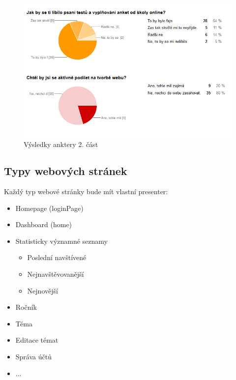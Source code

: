 \documentclass[thesis=B,czech]{FITthesis}[2012/06/26]
\begin{document}
\begin{figure}
  \centering
	\includegraphics[scale=1.2]{anketa2.png}
	\caption{Výsledky anktery 2. část} \label{fig:anketa2} 
\end{figure}






\subsection{Typy webových stránek}
Každý typ webové stránky bude mít vlastní presenter:

\begin{itemize}
	\item Homepage (loginPage)
	\item Dashboard (home)
	\item Statisticky významné seznamy
	\begin{itemize}
		\item Poslední navštívené
		\item Nejnavštěvovanější
		\item Nejnovější
	\end{itemize}
	\item 	Ročník
	\item Téma
	\item Editace témat
	\item Správa účtů
	\item ...
\end{itemize}
\end{document}
